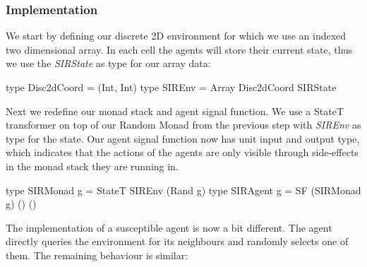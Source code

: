\subsubsection{Implementation}
We start by defining our discrete 2D environment for which we use an indexed two dimensional array. In each cell the agents will store their current state, thus we use the \textit{SIRState} as type for our array data:

\begin{HaskellCode}
type Disc2dCoord = (Int, Int)
type SIREnv      = Array Disc2dCoord SIRState
\end{HaskellCode}

Next we redefine our monad stack and agent signal function. We use a StateT transformer on top of our Random Monad from the previous step with \textit{SIREnv} as type for the state. Our agent signal function now has unit input and output type, which indicates that the actions of the agents are only visible through side-effects in the monad stack they are running in.

\begin{HaskellCode}
type SIRMonad g = StateT SIREnv (Rand g)
type SIRAgent g = SF (SIRMonad g) () ()
\end{HaskellCode}

The implementation of a susceptible agent is now a bit different. The agent directly queries the environment for its neighbours and randomly selects one of them. The remaining behaviour is similar:

